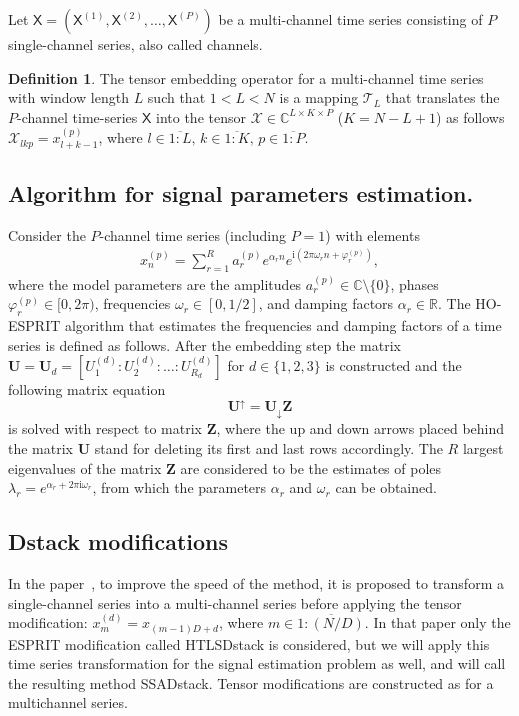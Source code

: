 \documentclass[12pt]{article}
\newcommand{\tX}{\mathsf{X}}
\newcommand{\calX}{\mathcal{X}}
\newcommand{\calT}{\mathcal{T}}
\newcommand{\iu}{\mathrm{i}}
\theoremstyle{definition}
\newtheorem{definition}{Definition}
\begin{document}
Let $\tX = (\tX^{(1)}, \tX^{(2)}, \ldots, \tX^{(P)})$ be a multi-channel
time series consisting of $P$ single-channel series, also called channels.
\begin{definition}
  The tensor embedding operator for a multi-channel time series with
  window length $L$ such that ${1< L < N}$ is a mapping $\calT_{L}$
  that translates the
  $P$-channel time-series $\tX$ into the tensor $\calX \in
  \mathbb{C}^{L\times K \times P}$ (${K = N - L + 1}$) as follows
  $\mathcal{X}_{lkp} =  x_{l+k-1}^{(p)}$, where ${l \in
  \overline{1:L}},\, {k \in \overline{1:K}},\, {p \in \overline{1:P}}$.
\end{definition}

\subsection{Algorithm for signal parameters estimation.}
Consider the $P$-channel time series (including $P=1$) with elements
\begin{gather*}
  x_n^{(p)}= \sum_{r=1}^{R} a_r^{(p)} e^{\alpha_r n} e^{\iu\left(2\pi
  \omega_r n + \varphi_r^{(p)}\right)},
\end{gather*}
where the model parameters are the amplitudes $a_r^{(p)} \in
\mathbb{C}\setminus\{0\}$, phases ${\varphi_r^{(p)} \in [0, 2\pi)}$,
frequencies $\omega_r\in [0, 1/2]$, and damping factors $\alpha_r \in
\mathbb{R}$. The HO-ESPRIT algorithm that estimates the frequencies
and damping factors of a time series is defined as follows.
After the embedding step the matrix $\mathbf{U} = \mathbf{U}_d =
\left[U_1^{(d)} :
U_2^{(d)}:\ldots : U_{R_d}^{(d)}\right]$ for $d\in \{1, 2,
3\}$ is constructed and the following matrix equation
\begin{equation*}
  \mathbf{U}^{\uparrow}=\mathbf{U}_{\downarrow}\mathbf{Z}
\end{equation*}
is solved with respect to matrix $\mathbf{Z}$, where the up and down
arrows placed
behind the matrix $\mathbf{U}$ stand for deleting its first and last
rows accordingly.
The $R$ largest eigenvalues of the matrix $\mathbf{Z}$ are considered
to be the estimates of poles $\lambda_r = e^{\alpha_r + 2\pi\iu
\omega_r}$, from which the parameters $\alpha_r$ and $\omega_r$ can be obtained.

\subsection{Dstack modifications}
In the paper~\cite{Papy2009}, to improve the speed of the method, it
is proposed to transform a single-channel series into a multi-channel
series before applying the tensor modification: $x_m^{(d)} =
x_{(m-1)D + d}$, where $m \in \overline{1:(N/D)}$. In that paper only
the ESPRIT modification called HTLSDstack is considered, but we will
apply this time series transformation for the signal estimation
problem as well, and will call the resulting method SSADstack.
Tensor modifications are constructed as for a multichannel series.
\end{document}
